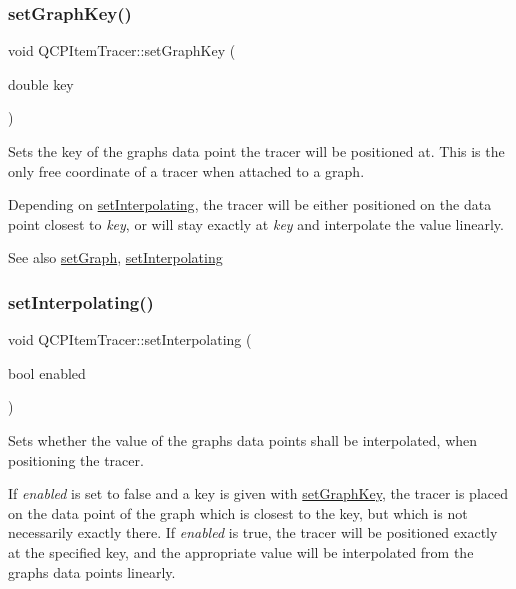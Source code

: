 \subsubsection{\texorpdfstring{set\+Graph\+Key()}{setGraphKey()}}
{\footnotesize\ttfamily void Q\+C\+P\+Item\+Tracer\+::set\+Graph\+Key (\begin{DoxyParamCaption}\item[{double}]{key }\end{DoxyParamCaption})}

Sets the key of the graph\textquotesingle{}s data point the tracer will be positioned at. This is the only free coordinate of a tracer when attached to a graph.

Depending on \hyperlink{class_q_c_p_item_tracer_a6c244a9d1175bef12b50afafd4f5fcd2}{set\+Interpolating}, the tracer will be either positioned on the data point closest to {\itshape key}, or will stay exactly at {\itshape key} and interpolate the value linearly.

\begin{DoxySeeAlso}{See also}
\hyperlink{class_q_c_p_item_tracer_af5886f4ded8dd68cb4f3388f390790c0}{set\+Graph}, \hyperlink{class_q_c_p_item_tracer_a6c244a9d1175bef12b50afafd4f5fcd2}{set\+Interpolating} 
\end{DoxySeeAlso}
\mbox{\label{class_q_c_p_item_tracer_a6c244a9d1175bef12b50afafd4f5fcd2}} 
\subsubsection{\texorpdfstring{set\+Interpolating()}{setInterpolating()}}
{\footnotesize\ttfamily void Q\+C\+P\+Item\+Tracer\+::set\+Interpolating (\begin{DoxyParamCaption}\item[{bool}]{enabled }\end{DoxyParamCaption})}

Sets whether the value of the graph\textquotesingle{}s data points shall be interpolated, when positioning the tracer.

If {\itshape enabled} is set to false and a key is given with \hyperlink{class_q_c_p_item_tracer_a6840143b42f3b685cedf7c6d83a704c8}{set\+Graph\+Key}, the tracer is placed on the data point of the graph which is closest to the key, but which is not necessarily exactly there. If {\itshape enabled} is true, the tracer will be positioned exactly at the specified key, and the appropriate value will be interpolated from the graph\textquotesingle{}s data points linearly.


